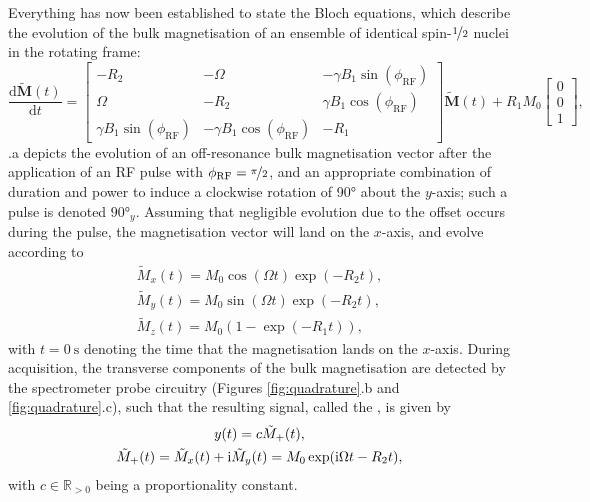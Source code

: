 Everything has now been established to state the Bloch equations, which
describe the evolution of the bulk magnetisation of an ensemble of identical
spin-$\nicefrac{1}{2}$ nuclei in the rotating frame:
\begin{equation}
    \frac{\mathrm{d}\tilde{\symbf{M}}(t)}{\mathrm{d}t} =
    \begin{bmatrix}
        -R_2 & -\Omega & -\gamma B_1 \sin(\phi_{\text{RF}}) \\
        \Omega & -R_2 & \gamma B_1 \cos(\phi_{\text{RF}}) \\
        \gamma B_1 \sin(\phi_{\text{RF}}) & -\gamma B_1 \cos(\phi_{\text{RF}}) & -R_1
    \end{bmatrix}
    \tilde{\symbf{M}}(t)
    + R_1 M_0
    \begin{bmatrix}
        0 \\ 0 \\ 1
    \end{bmatrix},
\end{equation}
.a depicts the
evolution of an off-resonance bulk
magnetisation vector after the application of an
\ac{RF} pulse with $\phi_{\text{RF}} = \nicefrac{\pi}{2}$, and an appropriate
combination of duration and power to induce a clockwise rotation of \ang{90}
about the $y$-axis; such a pulse is denoted $\ang{90}_{y}$.
Assuming that negligible evolution due to the offset occurs during the pulse,
the magnetisation vector will land on the $x$-axis, and evolve according to
\begin{subequations}
    \begin{gather}
        \tilde{M}_x(t) = M_0 \cos(\Omega t) \exp(-R_2 t),\\
        \tilde{M}_y(t) = M_0 \sin(\Omega t) \exp(-R_2 t),\\
        \tilde{M}_z(t) = M_0 (1 - \exp(-R_1 t)),
    \end{gather}
\end{subequations}
with $t=\qty{0}{\second}$ denoting the time that the magnetisation lands on the
$x$-axis.
During acquisition, the transverse components of the bulk magnetisation are
detected by the spectrometer probe circuitry
(Figures \ref{fig:quadrature}.b and \ref{fig:quadrature}.c), such that the
resulting signal, called the , is given by
\begin{subequations}
    \begin{gather}
        y(t) = c \tilde{M}_+(t),\\
        \tilde{M}_+(t) = \tilde{M}_x (t) + \mathrm{i} \tilde{M}_y (t) = M_0 \exp(\mathrm{i} \Omega t - R_2 t),
    \end{gather}
\end{subequations}
with $c \in \mathbb{R}_{>0}$ being a proportionality constant.


